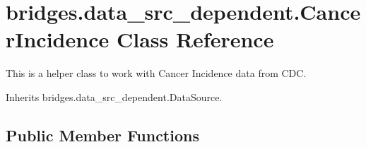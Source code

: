 \hypertarget{classbridges_1_1data__src__dependent_1_1_cancer_incidence}{}\section{bridges.\+data\+\_\+src\+\_\+dependent.\+Cancer\+Incidence Class Reference}
\label{classbridges_1_1data__src__dependent_1_1_cancer_incidence}


This is a helper class to work with Cancer Incidence data from C\+DC.  




Inherits bridges.\+data\+\_\+src\+\_\+dependent.\+Data\+Source.

\subsection*{Public Member Functions}
